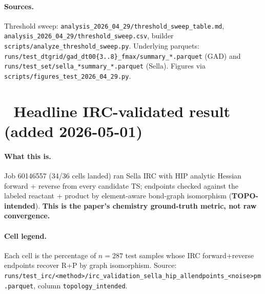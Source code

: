 \documentclass[11pt]{article}
\begin{document}
\paragraph{Sources.} Threshold sweep:
\texttt{analysis\_2026\_04\_29/threshold\_sweep\_table.md},
\texttt{analysis\_2026\_04\_29/threshold\_sweep.csv}, builder
\texttt{scripts/analyze\_threshold\_sweep.py}. Underlying parquets:
\texttt{runs/test\_dtgrid/gad\_dt00\{3..8\}\_fmax/summary\_*.parquet} (GAD)
and \texttt{runs/test\_set/sella\_*\/summary\_*.parquet} (Sella).
Figures via \texttt{scripts/figures\_test\_2026\_04\_29.py}.

\newpage
\section{🎯 Headline IRC-validated result (added 2026-05-01)}

\paragraph{What this is.} Job 60146557 (34/36 cells landed) ran Sella IRC
with HIP analytic Hessian forward + reverse from every candidate TS;
endpoints checked against the labeled reactant + product by element-aware
bond-graph isomorphism (\textbf{TOPO-intended}). \textbf{This is the paper's
chemistry ground-truth metric, not raw convergence.}

\paragraph{Cell legend.} Each cell is the percentage of $n=287$ test
samples whose IRC forward+reverse endpoints recover R+P by graph
isomorphism. Source:
\texttt{runs/test\_irc/<method>/irc\_validation\_sella\_hip\_allendpoints\_<noise>pm.parquet},
column \texttt{topology\_intended}.
\end{document}
